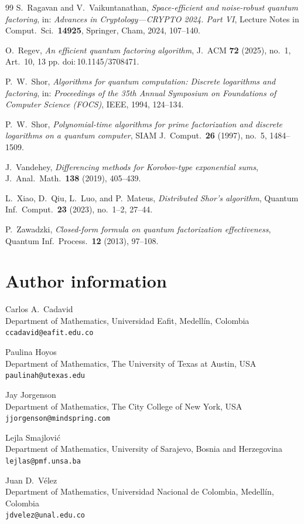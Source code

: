 \documentclass[11pt,reqno]{article}
\numberwithin{equation}{section}
\theoremstyle{plain}
\theoremstyle{definition}
\theoremstyle{remark}
\begin{document}
\begin{thebibliography}{99}
S.~Ragavan and V.~Vaikuntanathan,
\emph{Space-efficient and noise-robust quantum factoring},
in: \emph{Advances in Cryptology---CRYPTO 2024. Part VI},
Lecture Notes in Comput.\ Sci.\ \textbf{14925}, Springer, Cham, 2024, 107--140.

O.~Regev,
\emph{An efficient quantum factoring algorithm},
J.\ ACM \textbf{72} (2025), no.~1, Art.~10, 13 pp.
doi:\,10.1145/3708471.

P.~W.~Shor,
\emph{Algorithms for quantum computation: Discrete logarithms and factoring},
in: \emph{Proceedings of the 35th Annual Symposium on Foundations of Computer Science (FOCS)},
IEEE, 1994, 124--134.

P.~W.~Shor,
\emph{Polynomial-time algorithms for prime factorization and discrete logarithms on a quantum computer},
SIAM J.\ Comput.\ \textbf{26} (1997), no.~5, 1484--1509.

J.~Vandehey,
\emph{Differencing methods for Korobov-type exponential sums},
J.\ Anal.\ Math.\ \textbf{138} (2019), 405--439.

L.~Xiao, D.~Qiu, L.~Luo, and P.~Mateus,
\emph{Distributed Shor's algorithm},
Quantum Inf.\ Comput.\ \textbf{23} (2023), no.~1--2, 27--44.

P.~Zawadzki,
\emph{Closed-form formula on quantum factorization effectiveness},
Quantum Inf.\ Process.\ \textbf{12} (2013), 97--108.

\end{thebibliography}



\section*{Author information}

Carlos A.\ Cadavid\\
Department of Mathematics, Universidad Eafit, Medell\'in, Colombia\\
\texttt{ccadavid@eafit.edu.co}

\medskip
Paulina Hoyos\\
Department of Mathematics, The University of Texas at Austin, USA\\
\texttt{paulinah@utexas.edu}

\medskip
Jay Jorgenson\\
Department of Mathematics, The City College of New York, USA\\
\texttt{jjorgenson@mindspring.com}

\medskip
Lejla Smajlovi\'c\\
Department of Mathematics, University of Sarajevo, Bosnia and Herzegovina\\
\texttt{lejlas@pmf.unsa.ba}

\medskip
Juan D.\ V\'elez\\
Department of Mathematics, Universidad Nacional de Colombia, Medell\'in, Colombia\\
\texttt{jdvelez@unal.edu.co}
\end{document}
